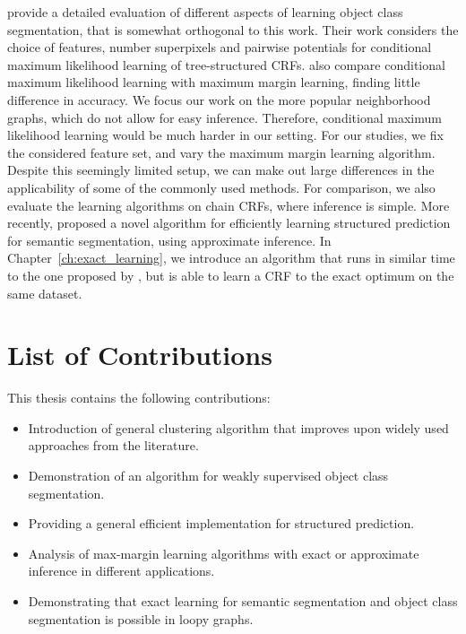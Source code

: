\citet{nowozin2010parameter} provide a detailed evaluation of different aspects of learning object class
segmentation, that is somewhat orthogonal to this work. Their work considers the choice of features,
number superpixels and pairwise potentials for conditional maximum likelihood learning of tree-structured CRFs.
\citet{nowozin2010parameter} also compare conditional maximum likelihood learning with maximum margin learning,
finding little difference in accuracy.
We focus our work on the more popular neighborhood graphs, which do not allow for easy inference.
Therefore, conditional maximum likelihood learning would be much harder in our setting. For our studies,
we fix the considered feature set, and vary the maximum margin learning algorithm. Despite
this seemingly limited setup, we can make out large differences in the applicability of
some of the commonly used methods. For comparison, we also evaluate the learning algorithms
on chain CRFs, where inference is simple.
More recently, \citet{lucchi2013learning} proposed a novel algorithm for
efficiently learning structured prediction for semantic segmentation, using
approximate inference. In Chapter~\ref{ch:exact_learning}, we introduce an
algorithm that runs in similar time to the one proposed by
\citet{lucchi2013learning}, but is able to learn a CRF to the exact optimum on
the same dataset.


\section{List of Contributions}
This thesis contains the following contributions:
\begin{itemize}
\item Introduction of general clustering algorithm that improves upon widely used
    approaches from the literature.
\item Demonstration of an algorithm for  weakly supervised object class segmentation.
\item Providing a general efficient implementation for structured prediction.
\item Analysis of max-margin learning algorithms with exact or approximate inference in different applications.
\item Demonstrating that exact learning for semantic segmentation and object class segmentation is possible in loopy graphs.
\end{itemize}

